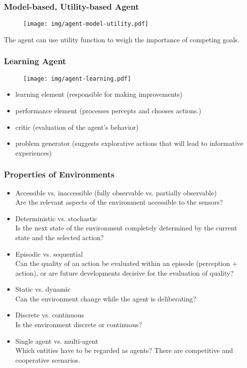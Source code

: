 \documentclass[UTF8,11pt,colorlinks,compress,openany]{beamer}%
\begin{document}
\begin{frame}\frametitle{Model-based, Utility-based Agent}
\begin{figure}[H]
	\texttt{[image: img/agent-model-utility.pdf]}
\end{figure}
The agent can use utility function to weigh the importance of competing goals.
\end{frame}

\begin{frame}\frametitle{Learning Agent}
\vspace*{-1ex}
\begin{figure}[H]
	\texttt{[image: img/agent-learning.pdf]}
\end{figure}
\begin{itemize}
	\item learning element (responsible for making improvements)
	\item performance element (processes percepts and chooses actions.)
	\item critic (evaluation of the agent's behavior)
	\item problem generator (suggests explorative actions that will lead to informative experiences)
\end{itemize}
\end{frame}

\begin{frame}\frametitle{Properties of Environments}
\begin{itemize}
	\item Accessible vs. inaccessible (fully observable vs. partially observable)\\
Are the relevant aspects of the environment accessible to the sensors?
	\item Deterministic vs. stochastic\\
Is the next state of the environment completely determined by the current state and the selected action?
	\item Episodic vs. sequential\\
Can the quality of an action be evaluated within an episode (perception $+$ action), or are future developments decisive for the evaluation of quality?
	\item Static vs. dynamic\\
Can the environment change while the agent is deliberating?
	\item Discrete vs. continuous\\
Is the environment discrete or continuous?
	\item Single agent vs. multi-agent\\
Which entities have to be regarded as agents? There are competitive and cooperative scenarios.
\end{itemize}
\end{frame}
\end{document}
